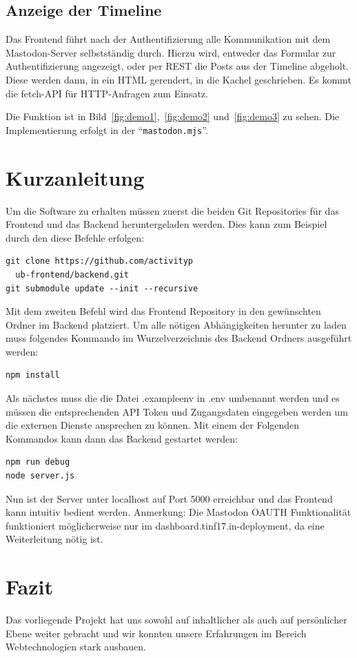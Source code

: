 \documentclass[fleqn,10pt]{SelfArx} %
\begin{document}
\subsection{Anzeige der Timeline}
Das Frontend führt nach der Authentifizierung alle Kommunikation mit dem Mastodon-Server selbstständig durch. Hierzu wird, entweder das Formular zur Authentifizierung angezeigt, oder per REST die Posts aus der Timeline abgeholt. Diese werden dann, in ein HTML gerendert, in die Kachel geschrieben. Es kommt die fetch-API für HTTP-Anfragen zum Einsatz.

Die Funktion ist in Bild~\ref{fig:demo1},~\ref{fig:demo2} und~\ref{fig:demo3} zu sehen. Die Implementierung erfolgt in der \enquote{\texttt{mastodon.mjs}}.

\section{Kurzanleitung}
Um die Software zu erhalten müssen zuerst die beiden Git Repositories für das Frontend und das Backend heruntergeladen werden. Dies kann zum Beispiel durch den diese Befehle erfolgen:
\begin{lstlisting}
git clone https://github.com/activityp
  ub-frontend/backend.git
git submodule update --init --recursive
\end{lstlisting}
Mit dem zweiten Befehl wird das Frontend Repository in den gewünschten Ordner im Backend platziert.
Um alle nötigen Abhängigkeiten herunter zu laden muss folgendes Kommando im Wurzelverzeichnis des Backend Ordners ausgeführt werden:
\begin{lstlisting}
npm install
\end{lstlisting}
Als nächstes muss die die Datei .exampleenv in .env umbenannt werden und es müssen die entsprechenden API Token und Zugangsdaten eingegeben werden um die externen Dienste ansprechen zu können.
Mit einem der Folgenden Kommandos kann dann das Backend gestartet werden:
\begin{lstlisting}
npm run debug
node server.js
\end{lstlisting}
Nun ist der Server unter localhost auf Port 5000 erreichbar und das Frontend kann intuitiv bedient werden.
Anmerkung: Die Mastodon OAUTH Funktionalität funktioniert möglicherweise nur im dashboard.tinf17.in-deployment, da eine Weiterleitung nötig ist.
\section{Fazit}
Das vorliegende Projekt hat uns sowohl auf inhaltlicher als auch auf persönlicher Ebene weiter gebracht und wir konnten unsere Erfahrungen im Bereich Webtechnologien stark ausbauen.
\end{document}
